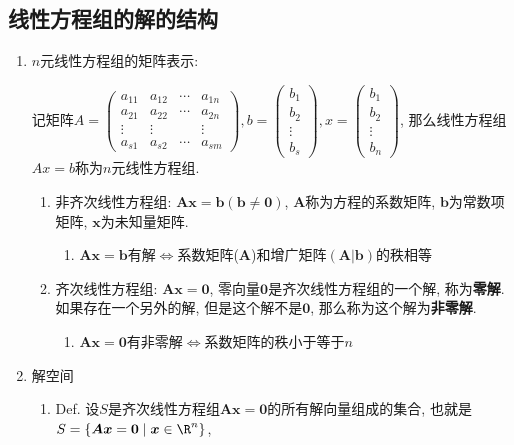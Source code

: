 \subsection{线性方程组的解的结构}
\begin{enumerate}
\item $n$元线性方程组的矩阵表示:

记矩阵$A=\begin{pmatrix}a_{11} & a_{12} & \cdots & a_{1n}\\
a_{21} & a_{22} & \cdots & a_{2n}\\
\vdots & \vdots &  & \vdots\\
a_{s1} & a_{s2} & \cdots & a_{sm}
\end{pmatrix},b=\begin{pmatrix}b_{1}\\
b_{2}\\
\vdots\\
b_{s}
\end{pmatrix},x=\begin{pmatrix}b_{1}\\
b_{2}\\
\vdots\\
b_{n}
\end{pmatrix}$, 那么线性方程组$Ax=b$称为$n$元线性方程组. 
\begin{enumerate}
\item 非齐次线性方程组: $\boldsymbol{A}\boldsymbol{x}=\boldsymbol{b}(\boldsymbol{b}\neq\boldsymbol{0})$,
$\boldsymbol{A}$称为方程的系数矩阵, $\boldsymbol{b}$为常数项矩阵, $\boldsymbol{x}$为未知量矩阵.
\begin{enumerate}
\item $\boldsymbol{Ax}=\boldsymbol{b}$有解$\Leftrightarrow$系数矩阵($\boldsymbol{A}$)和增广矩阵$(\boldsymbol{A}|\boldsymbol{b})$的秩相等
\end{enumerate}
\item 齐次线性方程组: $\boldsymbol{Ax}=\boldsymbol{0}$, 零向量$\boldsymbol{0}$是齐次线性方程组的一个解,
称为\textbf{零解}. 如果存在一个另外的解, 但是这个解不是$\boldsymbol{0}$, 那么称为这个解为\textbf{非零解}.
\begin{enumerate}
\item $\boldsymbol{Ax}=\boldsymbol{0}$有非零解$\Leftrightarrow$系数矩阵的秩小于等于$n$
\end{enumerate}
\end{enumerate}
\item 解空间
\begin{enumerate}
\item Def. 设$S$是齐次线性方程组$\boldsymbol{Ax}=\boldsymbol{0}$的所有解向量组成的集合, 也就是$S=\{\boldsymbol{Ax}=\boldsymbol{0}\mid\boldsymbol{x}\in\R^{n}\}$,

\end{enumerate}
\end{enumerate}
